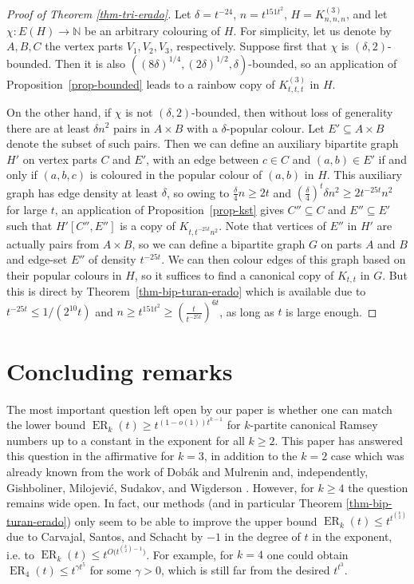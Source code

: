 \documentclass[11pt]{article}
\theoremstyle{plain}
\theoremstyle{definition}
\newcommand{\N}{\mathbb{N}}
\newcommand{\erado}[2]{\operatorname{ER}_{#1}(#2)}
\newcommand{\bicmpltt}[2]{K_{#1,#2}}
\newcommand{\bicmplt}[1]{\bicmpltt{#1}{#1}}
\newcommand{\tricmplt}[1]{K^{(3)}_{#1,#1,#1}}
\begin{document}
\begin{proof}[Proof of Theorem \ref{thm-tri-erado}]\sloppy
    Let $\delta=t^{-24}$, $n=t^{151t^2}$, $H=\tricmplt{n}$, and let $\chi:E(H)\to\N$ be an arbitrary colouring of $H$. For simplicity, let us denote by $A,B,C$ the vertex parts $V_1,V_2,V_3$, respectively. Suppose first that $\chi$ is $(\delta,2)$-bounded. Then it is also $\left((8\delta)^{1/4},(2\delta)^{1/2},\delta\right)$-bounded, so an application of Proposition~\ref{prop-bounded} leads to a rainbow copy of $\tricmplt{t}$ in $H$.

    On the other hand, if $\chi$ is not $(\delta,2)$-bounded, then without loss of generality there are at least $\delta n^2$ pairs in $A\times B$ with a $\delta$-popular colour. Let $E'\subseteq A\times B$ denote the subset of such pairs. Then we can define an auxiliary bipartite graph $H'$ on vertex parts $C$ and $E'$, with an edge between $c\in C$ and $(a,b)\in E'$ if and only if $(a,b,c)$ is coloured in the popular colour of $(a,b)$ in $H$. This auxiliary graph has edge density at least $\delta$, so owing to $\frac{\delta}{4}n\ge 2t$ and $(\frac{\delta}{4})^t \delta n^2 \ge 2t^{-25t} n^2$ for large $t$, an application of Proposition~\ref{prop-kst} gives $C''\subseteq C$ and $E''\subseteq E'$ such that $H'[C'',E'']$ is a copy of $\bicmpltt{t}{t^{-25t}n^2}$. Note that vertices of $E''$ in $H'$ are actually pairs from $A \times B$, so we can define a bipartite graph $G$ on parts $A$ and $B$ and edge-set $E''$ of density $t^{-25t}$. We can then colour edges of this graph based on their popular colours in $H$, so it suffices to find a canonical copy of $\bicmplt{t}$ in $G$. But this is direct by Theorem~\ref{thm-bip-turan-erado} which is available due to $t^{-25t}\le 1/(2^{10}t)$ and $n\ge t^{151t^2}\ge (\frac{t}{t^{-25t}})^{6t}$, as long as $t$ is large enough.
\end{proof}


\section{Concluding remarks}\label{sec-concl}

The most important question left open by our paper is whether one can match the lower bound $\erado{k}{t}\ge t^{(1-o(1))t^{k-1}}$ for $k$-partite canonical Ramsey numbers up to a constant in the exponent for all $k\ge 2$. This paper has answered this question in the affirmative for $k=3$, in addition to the $k=2$ case which was already known from the work of Dob\'ak and Mulrenin \cite{dobak2026sharp} and, independently, Gishboliner, Milojevi\'c, Sudakov, and Wigderson \cite{gishboliner2025canonical}. However, for $k\ge 4$ the question remains wide open. In fact, our methods (and in particular Theorem \ref{thm-bip-turan-erado}) only seem to be able to improve the upper bound $\erado{k}{t}\le t^{t^{\binom{k}{2}}}$ due to Carvajal, Santos, and Schacht \cite{carvajal2024canonical} by $-1$ in the degree of $t$ in the exponent, i.e. to $\erado{k}{t}\le t^{O\big(t^{\binom{k}{2}-1}\big)}$. For example, for $k=4$ one could obtain $\erado{4}{t}\le t^{\gamma t^5}$ for some $\gamma>0$, which is still far from the desired $t^{t^3}$.
\end{document}
